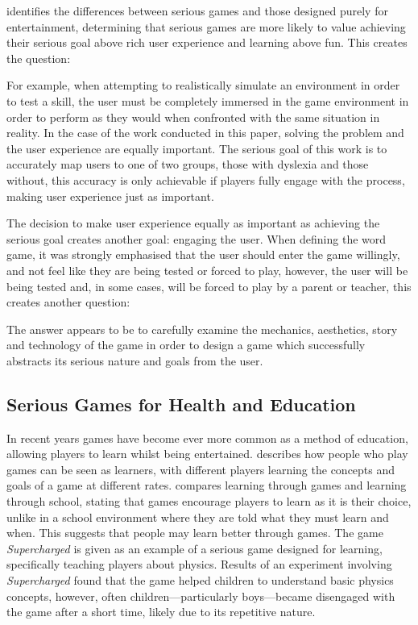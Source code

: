 \documentclass[journal]{IEEEtran}
\begin{document}
\cite{SeriousOverview} identifies the differences between serious games and those designed purely for entertainment, determining that serious games are more likely to value achieving their serious goal above rich user experience and learning above fun. This creates the question:

For example, when attempting to realistically simulate an environment in order to test a skill, the user must be completely immersed in the game environment in order to perform as they would when confronted with the same situation in reality. 
In the case of the work conducted in this paper, solving the problem and the user experience are equally important. The serious goal of this work is to accurately map users to one of two groups, those with dyslexia and those without, this accuracy is only achievable if players fully engage with the process, making user experience just as important. 

The decision to make user experience equally as important as achieving the serious goal creates another goal: engaging the user. When defining the word game, it was strongly emphasised that the user should enter the game willingly, and not feel like they are being tested or forced to play, however, the user will be being tested and, in some cases, will be forced to play by a parent or teacher, this creates another question:

The answer appears to be to carefully examine the mechanics, aesthetics, story and technology of the game in order to design a game which successfully abstracts its serious nature and goals from the user.

\subsection{Serious Games for Health and Education}
In recent years games have become ever more common as a method of education\cite{stapleton2004}, allowing players to learn whilst being entertained.
 \cite{stapleton2004} describes how people who play games can be seen as learners, with different players learning the concepts and goals of a game at different rates. \cite{stapleton2004} compares learning through games and learning through school, stating that games encourage players to learn as it is their choice, unlike in a school environment where they are told what they must learn and when. This suggests that people may learn better through games.
The game \emph{Supercharged} is given as an example of a serious game designed for learning, specifically teaching players about physics\cite{supercharged}. Results of an experiment involving \emph{Supercharged} found that the game helped children to understand basic physics concepts, however, often children---particularly boys---became disengaged with the game after a short time\cite{supercharged}, likely due to its repetitive nature.
\end{document}
